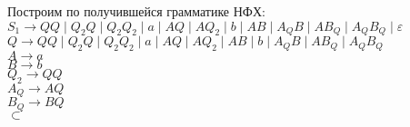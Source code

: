\documentclass[12pt]{article}
\theoremstyle{definition}
\theoremstyle{definition}
\let\ra\rightarrow
\let\epsilon\varepsilon
\begin{document}
Построим по получившейся грамматике НФХ:\\
\hspace*{0,5cm}$S_1 \ra QQ \mid Q_2Q \mid Q_2Q_2 \mid a \mid AQ \mid AQ_2 \mid b \mid AB \mid A_QB \mid AB_Q \mid A_QB_Q \mid \epsilon$\\
\hspace*{0,5cm}$Q \ra QQ \mid Q_2Q \mid Q_2Q_2 \mid a \mid AQ \mid AQ_2 \mid AB \mid b \mid A_QB \mid AB_Q \mid A_QB_Q$\\
\hspace*{0,5cm}$A \ra a$\\
\hspace*{0,5cm}$B \ra b$\\
\hspace*{0,5cm}$Q_2 \ra QQ$\\
\hspace*{0,5cm}$A_Q \ra AQ$\\
\hspace*{0,5cm}$B_Q \ra BQ$\\
$\subset$
\end{document}
